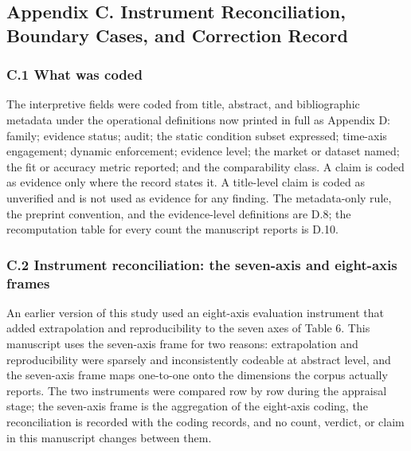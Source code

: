 \documentclass[11pt]{article}
\begin{document}
\subsection*{Appendix C. Instrument Reconciliation, Boundary Cases, and Correction Record}
\subsubsection*{C.1 What was coded}
The interpretive fields were coded from title, abstract, and bibliographic metadata under the operational definitions now printed in full as Appendix D: family; evidence status; audit; the static condition subset expressed; time-axis engagement; dynamic enforcement; evidence level; the market or dataset named; the fit or accuracy metric reported; and the comparability class. A claim is coded as evidence only where the record states it. A title-level claim is coded as unverified and is not used as evidence for any finding. The metadata-only rule, the preprint convention, and the evidence-level definitions are D.8; the recomputation table for every count the manuscript reports is D.10.

\subsubsection*{C.2 Instrument reconciliation: the seven-axis and eight-axis frames}
An earlier version of this study used an eight-axis evaluation instrument that added extrapolation and reproducibility to the seven axes of Table 6. This manuscript uses the seven-axis frame for two reasons: extrapolation and reproducibility were sparsely and inconsistently codeable at abstract level, and the seven-axis frame maps one-to-one onto the dimensions the corpus actually reports. The two instruments were compared row by row during the appraisal stage; the seven-axis frame is the aggregation of the eight-axis coding, the reconciliation is recorded with the coding records, and no count, verdict, or claim in this manuscript changes between them.
\end{document}
